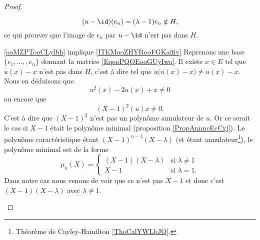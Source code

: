 \begin{proof}
\begin{subproof}
        \begin{equation}
            (u-\id)(e_n)=(\lambda-1)e_n\notin H,
        \end{equation}
        ce qui prouver que l'image de \( e_n\) par \( u-\id\) n'est pas dans \( H\).
    \item[\ref{ooMZPTooCLylbh} implique \ref{ITEMooZHYRooFGKaifiv}]
        Reprenons une base \( \{ e_1,\ldots, ,e_n \}\) donnant la matrice \eqref{EqooPQOEooGUyIwa}. Il existe \( x\in E\) tel que \( u(x)-x\) n'est pas dans \( H\), c'est à dire tel que \( u\big( u(x)-x \big)\neq u(x)-x\). Nous en déduisons que
        \begin{equation}
            u^2(x)-2u(x)+x\neq 0
        \end{equation}
        ou encore que 
        \begin{equation}
            (X-1)^2(u)x\neq 0.
        \end{equation}
        C'est à dire que \( (X-1)^2\) n'est pas un polynôme annulateur de \( u\). Or ce serait le cas si \( X-1\) était le polynôme minimal (proposition \ref{PropAnnncEcCxj}). Le polynôme caractéristique étant \( (X-1)^{n-1}(X-\lambda)\) (et étant annulateur\footnote{Théorème de Cayley-Hamilton \ref{ThoCalYWLbJQ}.}), le polynôme minimal est de la forme 
        \begin{equation}
            \mu_u(X)=\begin{cases}
                (X-1)(X-\lambda)    &   \text{si } \lambda\neq 1\\
                X-1    &    \text{si } \lambda=1.
            \end{cases}
        \end{equation}
        Dans notre cas nous venons de voir que ce n'est pas \( X-1\) et donc c'est \( (X-1)(X-\lambda)\) avec \( \lambda\neq 1\).


\end{subproof}
\end{proof}
